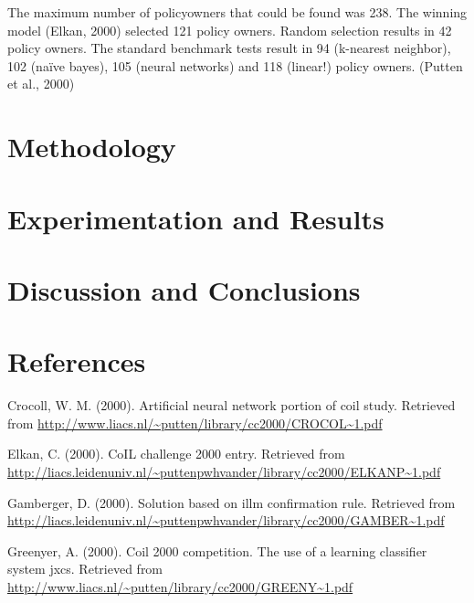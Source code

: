 \documentclass[man]{apa6}
\begin{document}
The maximum number of policyowners that could be found was 238. The winning model (Elkan, 2000) selected 121 policy owners. Random selection results in 42 policy owners. The standard benchmark tests result in 94 (k-nearest neighbor), 102 (naïve bayes), 105 (neural networks) and 118 (linear!) policy owners. (Putten et al., 2000)

\hypertarget{methodology}{%
\section{Methodology}\label{methodology}}

\hypertarget{experimentation-and-results}{%
\section{Experimentation and Results}\label{experimentation-and-results}}

\hypertarget{discussion-and-conclusions}{%
\section{Discussion and Conclusions}\label{discussion-and-conclusions}}

\newpage

\hypertarget{references}{%
\section{References}\label{references}}

\begingroup
\setlength{\parindent}{-0.5in}
\setlength{\leftskip}{0.5in}

\hypertarget{refs}{}
\leavevmode\hypertarget{ref-Crocoll}{}%
Crocoll, W. M. (2000). Artificial neural network portion of coil study. Retrieved from \url{http://www.liacs.nl/~putten/library/cc2000/CROCOL~1.pdf}

\leavevmode\hypertarget{ref-Elkan}{}%
Elkan, C. (2000). CoIL challenge 2000 entry. Retrieved from \url{http://liacs.leidenuniv.nl/~puttenpwhvander/library/cc2000/ELKANP~1.pdf}

\leavevmode\hypertarget{ref-Gamberger}{}%
Gamberger, D. (2000). Solution based on illm confirmation rule. Retrieved from \url{http://liacs.leidenuniv.nl/~puttenpwhvander/library/cc2000/GAMBER~1.pdf}

\leavevmode\hypertarget{ref-Greenyer}{}%
Greenyer, A. (2000). Coil 2000 competition. The use of a learning classifier system jxcs. Retrieved from \url{http://www.liacs.nl/~putten/library/cc2000/GREENY~1.pdf}
\end{document}

